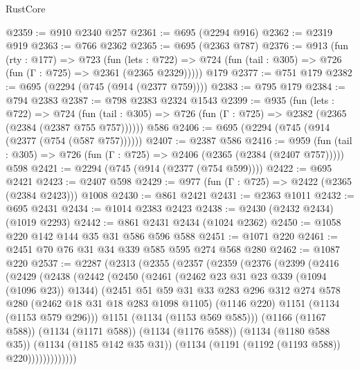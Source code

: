 \begin{lexlean}{RustCore}
\begin{coremodule}
@2359 := @910 @2340 @257
@2361 := @695 (@2294 @916)
@2362 := @2319 @919
@2363 := @766 @2362
@2365 := @695 (@2363 @787)
@2376 := @913
    (fun (rty : @177) =>
    @723
      (fun (lets : @722) =>
      @724 (fun (tail : @305) => @726 (fun (Γ : @725) => @2361 (@2365 @2329)))))
    @179
@2377 := @751 @179
@2382 := @695 (@2294 (@745 (@914 (@2377 @759))))
@2383 := @795 @179
@2384 := @794 @2383
@2387 := @798 @2383 @2324 @1543
@2399 := @935
    (fun (lets : @722) =>
    @724 (fun (tail : @305) => @726 (fun (Γ : @725) => @2382 (@2365 (@2384 (@2387 @755 @757))))))
    @586
@2406 := @695 (@2294 (@745 (@914 (@2377 (@754 (@587 @757))))))
@2407 := @2387 @586
@2416 := @959
    (fun (tail : @305) => @726 (fun (Γ : @725) => @2406 (@2365 (@2384 (@2407 @757)))))
    @598
@2421 := @2294 (@745 (@914 (@2377 (@754 @599))))
@2422 := @695 @2421
@2423 := @2407 @598
@2429 := @977 (fun (Γ : @725) => @2422 (@2365 (@2384 @2423))) @1008
@2430 := @861 @2421
@2431 := @2363 @1011
@2432 := @695 @2431
@2434 := @1014 @2383 @2423
@2438 := @2430 (@2432 @2434) (@1019 @2293)
@2442 := @861 @2431 @2434 (@1024 @2362)
@2450 := @1058 @220 @142 @144 @35 @31 @586 @596 @588
@2451 := @1071 @220
@2461 := @2451 @70 @76 @31 @34 @339 @585 @595 @274 @568 @280
@2462 := @1087 @220
@2537 := @2287
    (@2313
      (@2355
        (@2357
          (@2359
            (@2376
              (@2399
                (@2416
                  (@2429
                    (@2438
                      (@2442
                        (@2450
                          (@2461
                            (@2462 @23 @31 @23 @339 (@1094 (@1096 @23)) @1344)
                            (@2451
                              @51
                              @59
                              @31
                              @33
                              @283
                              @296
                              @312
                              @274
                              @578
                              @280
                              (@2462 @18 @31 @18 @283 @1098 @1105)
                              (@1146 @220)
                              @1151
                              (@1134 (@1153 @579 @296)))
                            @1151
                            (@1134 (@1153 @569 @585)))
                          (@1166 (@1167 @588))
                          (@1134 (@1171 @588))
                          (@1134 (@1176 @588))
                          (@1134 (@1180 @588 @35))
                          (@1134 (@1185 @142 @35 @31))
                          (@1134 (@1191 (@1192 (@1193 @588)) @220)))))))))))))

\end{coremodule}
\end{lexlean}
